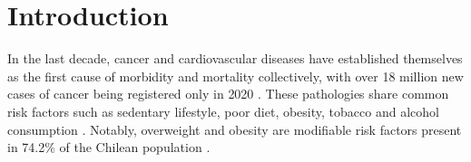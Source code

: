 \documentclass[journal,article,submit,pdftex,moreauthors]{Definitions/mdpi}
\begin{document}

\section{Introduction}

In the last decade, cancer and cardiovascular diseases have established themselves as the first cause of morbidity and mortality collectively, with over 18 million new cases of cancer being registered only in 2020 \cite{cancertoday}. These pathologies share common risk factors such as sedentary lifestyle, poor diet, obesity, tobacco and alcohol consumption \cite{WHOtop10}. Notably, overweight and obesity are modifiable risk factors present in 74.2\% of the Chilean population \cite{margozzini2018encuesta}.\\
\end{document}
